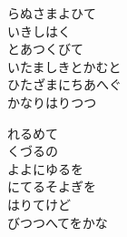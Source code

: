 \documentclass[10pt,b5j]{tarticle} %
\begin{document}
\begin{enumerate}
\begin{minipage}[c]{\blocksize}
        \vspace{\linespace}
        \item
        らぬさまよひて\\
        いきしはく\\
        とあつくびて\\
        いたましきとかむと\\
        ひたざまにちあへぐ\\
        かなりはりつつ
        
        \vspace{\linespace}
        \item
        れるめて\\
        くづるの\\
        よよにゆるを\\
        にてるそよぎを\\
        はりてけど\\
        びつつへてをかな
    
    \end{minipage}
\end{enumerate} %
\end{document}
